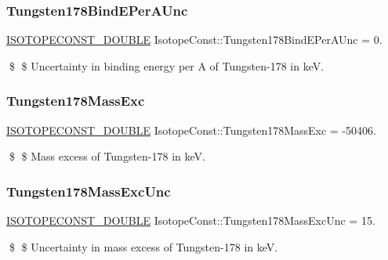 \subsubsection{\texorpdfstring{Tungsten178\+Bind\+E\+Per\+A\+Unc}{Tungsten178BindEPerAUnc}}
{\footnotesize\ttfamily \mbox{\hyperlink{group___isotope_const-_macros_ga8f45a7272ce02c0b4c65c44636ed719a}{I\+S\+O\+T\+O\+P\+E\+C\+O\+N\+S\+T\+\_\+\+D\+O\+U\+B\+LE}} Isotope\+Const\+::\+Tungsten178\+Bind\+E\+Per\+A\+Unc = 0.}

\$ \$ Uncertainty in binding energy per A of Tungsten-\/178 in keV. \mbox{\label{group___isotope_const-_tungsten-_w178_ga982bf5108d395609f954b84cf919209c}} 
\subsubsection{\texorpdfstring{Tungsten178\+Mass\+Exc}{Tungsten178MassExc}}
{\footnotesize\ttfamily \mbox{\hyperlink{group___isotope_const-_macros_ga8f45a7272ce02c0b4c65c44636ed719a}{I\+S\+O\+T\+O\+P\+E\+C\+O\+N\+S\+T\+\_\+\+D\+O\+U\+B\+LE}} Isotope\+Const\+::\+Tungsten178\+Mass\+Exc = -\/50406.}

\$ \$ Mass excess of Tungsten-\/178 in keV. \mbox{\label{group___isotope_const-_tungsten-_w178_gadaf147d3bbeb64a2a75bfc92f69eaa0e}} 
\subsubsection{\texorpdfstring{Tungsten178\+Mass\+Exc\+Unc}{Tungsten178MassExcUnc}}
{\footnotesize\ttfamily \mbox{\hyperlink{group___isotope_const-_macros_ga8f45a7272ce02c0b4c65c44636ed719a}{I\+S\+O\+T\+O\+P\+E\+C\+O\+N\+S\+T\+\_\+\+D\+O\+U\+B\+LE}} Isotope\+Const\+::\+Tungsten178\+Mass\+Exc\+Unc = 15.}

\$ \$ Uncertainty in mass excess of Tungsten-\/178 in keV. \mbox{\label{group___isotope_const-_tungsten-_w178_ga31f1e8f4652249358437394f2bfd1698}} 
